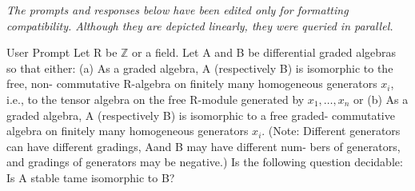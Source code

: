 \documentclass{article}
\date{}
\theoremstyle{plain}
\theoremstyle{definition}
\begin{document}
\emph{The prompts and responses below have been edited only for
formatting compatibility. Although they are depicted linearly, they were queried in parallel.}

\begin{problem}{User Prompt} Let R be $\mathbb{Z}$ or a field. Let A and B be differential graded
algebras so that either:
(a) As a graded algebra, A (respectively B) is isomorphic to the free, non-
commutative R-algebra on finitely many homogeneous generators $x_i$, i.e.,
to the tensor algebra on the free R-module generated by $x_1,\dots,x_n$ or
(b) As a graded algebra, A (respectively B) is isomorphic to a free graded-
commutative algebra on finitely many homogeneous generators $x_i$.
(Note: Different generators can have different gradings, Aand B may have different num-
bers of generators, and gradings of generators may be negative.)
Is the following question decidable:  Is A stable tame isomorphic to B?
\end{problem}
\end{document}
